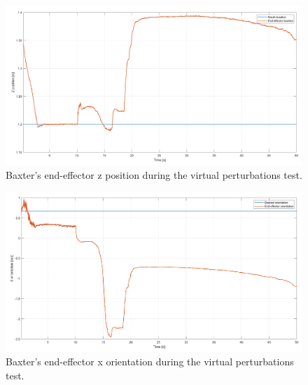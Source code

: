 \documentclass[11pt]{report} %
\begin{document}
\begin{figure}[H]
    \centering
    \includegraphics[width=1.0\linewidth]{assets/imgs/control_theory/mpc_regulation_virtual_perturbations/z_pose.png}
    \caption{Baxter's end-effector z position during the virtual perturbations test.} 
    \label{fig_baxter_z_pose_mpc_virtual_perturbations_experiments}
\end{figure}

\begin{figure}[H]
    \centering
    \includegraphics[width=1.0\linewidth]{assets/imgs/control_theory/mpc_regulation_virtual_perturbations/x_orientation.png}
    \caption{Baxter's end-effector x orientation during the virtual perturbations test.} 
    \label{fig_baxter_x_orientation_mpc_virtual_perturbations_experiments}
\end{figure}
\end{document}
